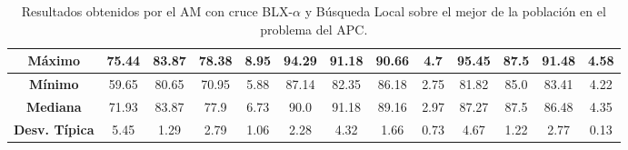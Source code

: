\documentclass[11pt,a4paper]{article}
\begin{document}
\begin{table}[H]
{\begin{tabular}{c|c|c|c|c|c|c|c|c|c|c|c|c|}
\multicolumn{1}{|c|}{\textbf{Máximo}}       & 75.44             & 83.87                   & 78.38         & 8.95       & 94.29             & 91.18          & 90.66         & 4.7        & 95.45             & 87.5           & 91.48         & 4.58       \\ \hline
\multicolumn{1}{|c|}{\textbf{Mínimo}}       & 59.65             & 80.65                   & 70.95         & 5.88       & 87.14             & 82.35          & 86.18         & 2.75       & 81.82             & 85.0           & 83.41         & 4.22       \\ \hline
\multicolumn{1}{|c|}{\textbf{Mediana}}      & 71.93             & 83.87                   & 77.9          & 6.73       & 90.0              & 91.18          & 89.16         & 2.97       & 87.27             & 87.5           & 86.48         & 4.35       \\ \hline
\multicolumn{1}{|c|}{\textbf{Desv. Típica}} & 5.45              & 1.29                    & 2.79          & 1.06       & 2.28              & 4.32           & 1.66          & 0.73       & 4.67              & 1.22           & 2.77          & 0.13       \\ \hline
\end{tabular}
}%
\caption{Resultados obtenidos por el AM con cruce BLX-$\alpha$ y Búsqueda Local sobre el mejor de la población en el problema
del APC.}
\end{table}
\end{document}

